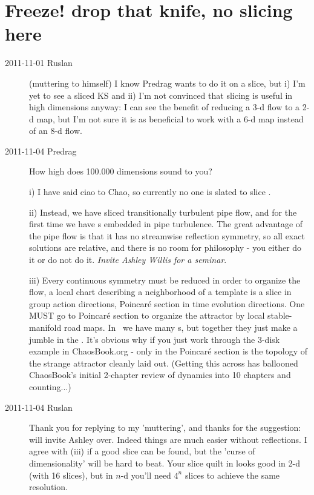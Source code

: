 \section{Freeze! drop that knife, no slicing here}
\label{sect:freeze}
\renewcommand{\LieElrep}{\ensuremath{g}} %

\begin{description}

\item[2011-11-01 Ruslan] (muttering to himself)             \toCB
I know Predrag wants to do it on a slice, but
i) I'm yet to see a sliced KS and
ii) I'm not convinced that slicing is useful in high dimensions anyway:
I can see the benefit of reducing a 3-d flow to a 2-d map, but I'm not
sure it is as beneficial to work with a 6-d map instead of an 8-d flow.

\item[2011-11-04 Predrag]              \toCB
How high does 100.000 dimensions sound to you?

i) I have said ciao to Chao, so currently no one is slated to slice
\KS.

ii) Instead, we have sliced transitionally turbulent pipe flow, and
for the first time we have \rpo s embedded in pipe turbulence. The great
advantage of the pipe flow is that it has no streamwise reflection
symmetry, so all exact solutions are relative, and there is no room for
philosophy - you either do it or do not do it. \emph{Invite Ashley Willis
for a seminar}.

iii) Every continuous symmetry must be reduced in order
to organize the flow, a local chart describing a neighborhood of a
template is a slice in group action directions, Poincar\'e section in
time evolution directions. One MUST go to Poincar\'e section to organize
the attractor by local stable-manifold road maps. In \pCf\ we have many
\po s, but together they just make a jumble in the \statesp. It's obvious
why if you just work through the 3-disk example in ChaosBook.org - only
in the Poincar\'e section is the topology of the strange attractor
cleanly laid out. (Getting this across has ballooned ChaosBook's
initial 2-chapter review of dynamics into 10 chapters and counting...)

\item[2011-11-04 Ruslan] Thank you for replying to my 'muttering', and
thanks for the suggestion: will invite Ashley over.  Indeed things are
much easier without reflections.  I agree with (iii) if a good slice can
be found, but the 'curse of dimensionality' will be hard to beat.  Your
slice quilt in  looks good in 2-d (with 16 slices),
but in $n$-d you'll need $4^n$ slices to achieve the same resolution.


\end{description}
